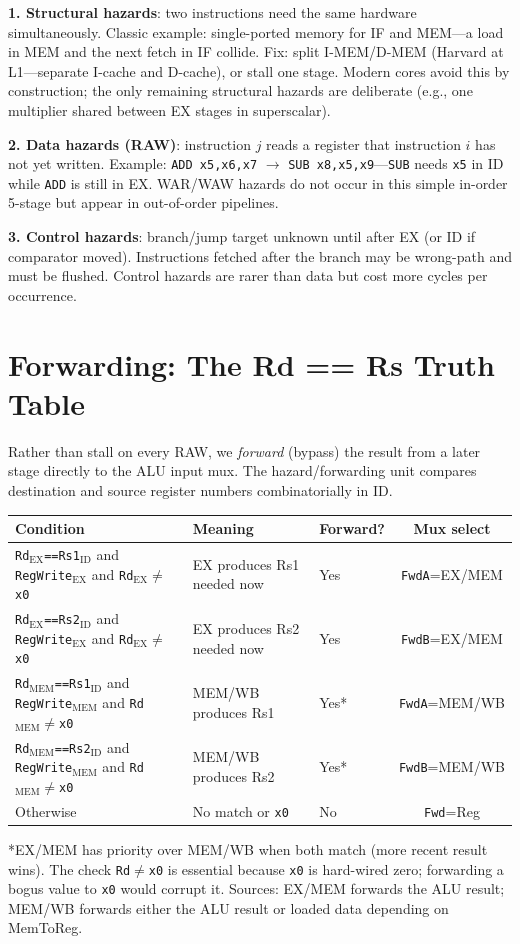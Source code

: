 \textbf{1. Structural hazards}: two instructions need the same hardware simultaneously. Classic example: single-ported memory for IF and MEM---a load in MEM and the next fetch in IF collide. Fix: split I-MEM/D-MEM (Harvard at L1---separate I-cache and D-cache), or stall one stage. Modern cores avoid this by construction; the only remaining structural hazards are deliberate (e.g., one multiplier shared between EX stages in superscalar).

\textbf{2. Data hazards (RAW)}: instruction $j$ reads a register that instruction $i$ has not yet written. Example: \texttt{ADD x5,x6,x7} $\to$ \texttt{SUB x8,x5,x9}---\texttt{SUB} needs \texttt{x5} in ID while \texttt{ADD} is still in EX. WAR/WAW hazards do not occur in this simple in-order 5-stage but appear in out-of-order pipelines.

\textbf{3. Control hazards}: branch/jump target unknown until after EX (or ID if comparator moved). Instructions fetched after the branch may be wrong-path and must be flushed. Control hazards are rarer than data but cost more cycles per occurrence.

\section{Forwarding: The Rd == Rs Truth Table}
Rather than stall on every RAW, we \emph{forward} (bypass) the result from a later stage directly to the ALU input mux. The hazard/forwarding unit compares destination and source register numbers combinatorially in ID.

\begin{center}
\small
\begin{tabular}{lllc}
\toprule Condition & Meaning & Forward? & Mux select\\ \midrule
\texttt{Rd$_{\text{EX}}$==Rs1$_{\text{ID}}$} and \texttt{RegWrite$_{\text{EX}}$} and \texttt{Rd$_{\text{EX}}\neq$x0} & EX produces Rs1 needed now & Yes & \texttt{FwdA}=EX/MEM\\
\texttt{Rd$_{\text{EX}}$==Rs2$_{\text{ID}}$} and \texttt{RegWrite$_{\text{EX}}$} and \texttt{Rd$_{\text{EX}}\neq$x0} & EX produces Rs2 needed now & Yes & \texttt{FwdB}=EX/MEM\\
\texttt{Rd$_{\text{MEM}}$==Rs1$_{\text{ID}}$} and \texttt{RegWrite$_{\text{MEM}}$} and \texttt{Rd$_{\text{MEM}}\neq$x0} & MEM/WB produces Rs1 & Yes* & \texttt{FwdA}=MEM/WB\\
\texttt{Rd$_{\text{MEM}}$==Rs2$_{\text{ID}}$} and \texttt{RegWrite$_{\text{MEM}}$} and \texttt{Rd$_{\text{MEM}}\neq$x0} & MEM/WB produces Rs2 & Yes* & \texttt{FwdB}=MEM/WB\\
Otherwise & No match or \texttt{x0} & No & \texttt{Fwd}=Reg\\ \bottomrule
\end{tabular}
\end{center}
*EX/MEM has priority over MEM/WB when both match (more recent result wins). The check \texttt{Rd$\neq$x0} is essential because \texttt{x0} is hard-wired zero; forwarding a bogus value to \texttt{x0} would corrupt it. Sources: EX/MEM forwards the ALU result; MEM/WB forwards either the ALU result or loaded data depending on MemToReg.

